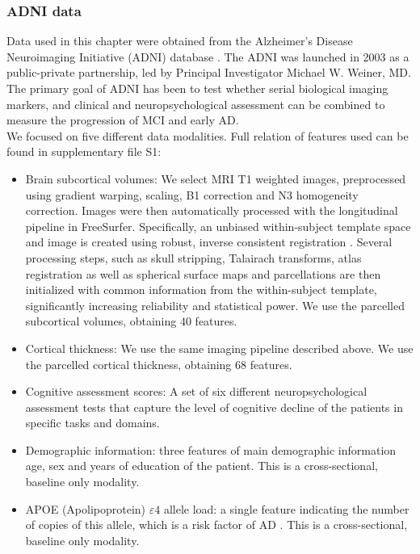 \subsubsection{ADNI data}

Data used in this chapter were obtained from the Alzheimer’s Disease Neuroimaging Initiative (ADNI) database \cite{Mueller2005}. The ADNI was launched in 2003 as a public-private partnership, led by Principal Investigator Michael W. Weiner, MD. The primary goal of ADNI has been to test whether serial biological imaging markers, and clinical and neuropsychological assessment can be combined to measure the progression of MCI and early AD. \\

We focused on five different data modalities. Full relation of features used can be found in supplementary file S1: \\

\begin{itemize}
    \item Brain subcortical volumes: We select MRI T1 weighted images, preprocessed using gradient warping, scaling, B1 correction and N3 homogeneity correction. Images were then automatically processed with the longitudinal pipeline \cite{Reuter2012} in FreeSurfer. Specifically, an unbiased within-subject template space and image is created using robust, inverse consistent registration \cite{Reuter2010}. Several processing steps, such as skull stripping, Talairach transforms, atlas registration as well as spherical surface maps and parcellations are then initialized with common information from the within-subject template, significantly increasing reliability and statistical power. We use the parcelled subcortical volumes, obtaining 40 features.
    \item Cortical thickness: We use the same imaging pipeline described above. We use the parcelled cortical thickness, obtaining 68 features.
    \item Cognitive assessment scores: A set of six different neuropsychological assessment tests that capture the level of cognitive decline of the patients in specific tasks and domains. 
    \item Demographic information: three features of main demographic information age, sex and years of education of the patient. This is a cross-sectional, baseline only modality.
    \item APOE (Apolipoprotein) $\varepsilon4$ allele load: a single feature indicating the number of copies of this allele, which is a risk factor of AD \cite{Saunders1993}. This is a cross-sectional, baseline only modality.
\end{itemize}

